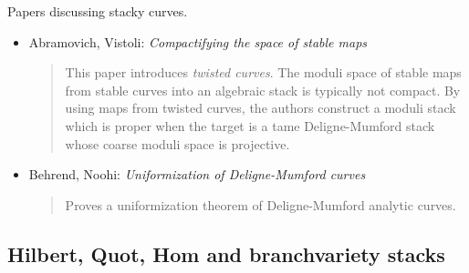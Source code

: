 \noindent
Papers discussing stacky curves.
\begin{itemize}
\item Abramovich, Vistoli: \emph{Compactifying the space of stable maps}
\cite{abramovich-vistoli}
\begin{quote}
This paper introduces \emph{twisted curves}. The moduli space of stable
maps from stable curves into an algebraic stack is typically not compact.
By using maps from twisted curves, the authors construct a moduli stack
which is proper when the target is a tame Deligne-Mumford stack whose
coarse moduli space is projective.
\end{quote}
\item Behrend, Noohi: \emph{Uniformization of Deligne-Mumford curves}
\cite{behrend-noohi}
\begin{quote}
Proves a uniformization theorem of Deligne-Mumford analytic curves.
\end{quote}
\end{itemize}

\subsection{Hilbert, Quot, Hom and branchvariety stacks}
\label{subsection-hilbert-quot-hom}

